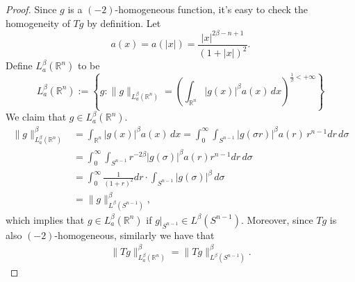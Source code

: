 \documentclass[12pt]{amsart}
\begin{document}
	\begin{proof}
		Since $g$ is a $(-2)$-homogeneous function, it's easy to check the homogeneity of $Tg$ by definition. 
		Let \begin{equation*}
			a(x) =a(|x|) = \frac{|x|^{2\beta -n +1}}{(1 + |x|)^2}. 
		\end{equation*}
		Define $ L_{a}^\beta (\mathbb{R}^n)$ to be
		\begin{equation*}
			L_{a}^\beta (\mathbb{R}^n):=\left\{g:\|g\|_{L_{a}^\beta (\mathbb{R}^n)} =\left( \int_{\mathbb{R}^n} |g(x)|^\beta a(x) \, dx  \right)^{\frac{1}{\beta}<+\infty}\right\}
		\end{equation*}
		We claim that $ g\in L_a^\beta(\mathbb{R}^n)$.
		\begin{equation}\label{Riesz-3}
			\begin{aligned}
				\|g\|_{L_a^\beta(\mathbb{R}^n)}^\beta   &= \int_{\mathbb{R}^n } |g(x)|^\beta a(x) \, dx  =
				\int_0^\infty \int_{S^{n-1}} |g(\sigma r)|^\beta a(r) \, r^{n-1}dr\, d\sigma  \\
				& = \int_0^\infty  \int_{S^{n-1}} r^{-2\beta}|g(\sigma)|^\beta a(r) r^{n-1} dr\, d\sigma  \\
				& = \int_0^\infty \frac{1}{(1+r)^2} dr \cdot \int_{S^{n-1}} |g(\sigma)|^\beta \, d\sigma \\
				& = \|g\|_{L^\beta(S^{n-1})}^\beta, 
			\end{aligned}
		\end{equation}
		which implies that $g\in L_{a}^\beta (\mathbb{R}^n)$ if   $g|_{S^{n-1}} \in L^\beta (S^{n-1})$. 
		Moreover, since $Tg$ is also $(-2)$-homogeneous, similarly we have that 
		\begin{equation}\label{eq:normequa}
			\begin{aligned}
				\|Tg\|_{L_a^\beta(\mathbb{R}^n)}^\beta =
				\|Tg\|_{L^\beta(S^{n-1})}^\beta. 
			\end{aligned} 
		\end{equation}
		

\end{proof}
\end{document}

